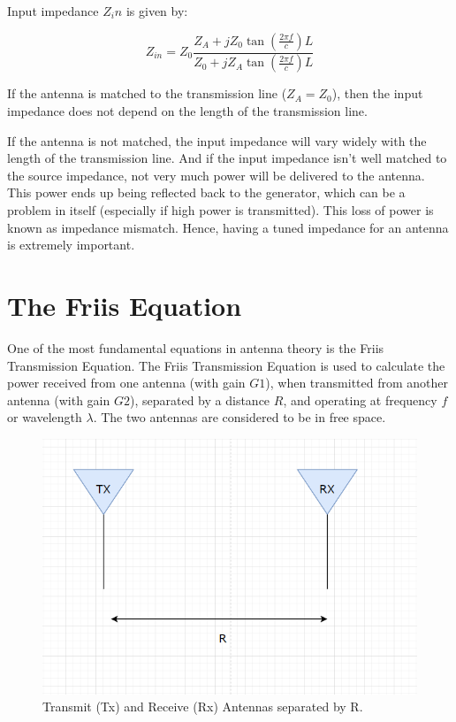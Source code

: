 \documentclass[a4paper,12pt]{report}
\begin{document}
Input impedance $Z_in$ is given by:

\begin{equation}
  Z_{in} = Z_0 \frac{Z_A + j Z_0 \tan(\frac{2\pi f}{c}) L}{Z_0 + j Z_A \tan(\frac{2\pi f}{c}) L}
\end{equation}

If the antenna is matched to the transmission line ($Z_A=Z_0$),
then the input impedance does not depend on the length of the transmission line.

If the antenna is not matched,
the input impedance will vary widely with the length of the transmission line.
And if the input impedance isn't well matched to the source impedance,
not very much power will be delivered to the antenna.
This power ends up being reflected back to the generator,
which can be a problem in itself (especially if high power is transmitted).
This loss of power is known as impedance mismatch.
Hence, having a tuned impedance for an antenna is extremely important.

\section{The Friis Equation}

One of the most fundamental equations in antenna theory is the Friis Transmission Equation.
The Friis Transmission Equation is used to calculate the power
received from one antenna
(with gain $G1$), when transmitted from another antenna (with gain $G2$),
separated by a distance $R$, and operating at frequency $f$ or wavelength $\lambda$. 
The two antennas are considered to be in free space.

\begin{figure}
  \begin{center}
    \includegraphics[clip, keepaspectratio, width=0.5\linewidth]{img/friis_equation.png}
    \caption{Transmit (Tx) and Receive (Rx) Antennas separated by R.}
    \label{fig:friis_equation}
  \end{center}
\end{figure}
\end{document}
